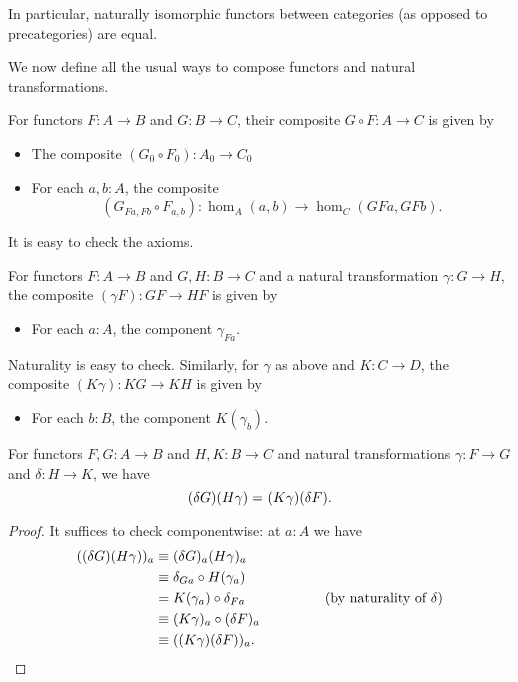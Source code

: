 In particular, naturally isomorphic functors between categories (as opposed to precategories) are equal.

\medskip

We now define all the usual ways to compose functors and natural transformations.

\begin{defn}
  For functors $F:A\to B$ and $G:B\to C$, their composite $G\circ F:A\to C$ is given by
  \begin{itemize}
  \item The composite $(G_0\circ F_0) : A_0 \to C_0$
  \item For each $a,b:A$, the composite
    \[(G_{Fa,Fb}\circ F_{a,b}):\hom_A(a,b) \to \hom_C(GFa,GFb).\]
  \end{itemize}
  It is easy to check the axioms.
\end{defn}

\begin{defn}
  For functors $F:A\to B$ and $G,H:B\to C$ and a natural transformation $\gamma:G\to H$, the composite $(\gamma F):GF\to HF$ is given by
  \begin{itemize}
  \item For each $a:A$, the component $\gamma_{Fa}$.
  \end{itemize}
  Naturality is easy to check.
  Similarly, for $\gamma$ as above and $K:C\to D$, the composite $(K\gamma):KG\to KH$ is given by
  \begin{itemize}
  \item For each $b:B$, the component $K(\gamma_b)$.
  \end{itemize}
\end{defn}

\begin{lem}\label{ct:interchange}
  For functors $F,G:A\to B$ and $H,K:B\to C$ and natural transformations $\gamma:F\to G$ and $\delta:H\to K$, we have
  \[(\delta G)(H\gamma) =_{} (K\gamma)(\delta F).\]
\end{lem}
\begin{proof}
  It suffices to check componentwise: at $a:A$ we have
  \begin{align*}
    ((\delta G)(H\gamma))_a
    &\equiv (\delta G)_{a}(H\gamma)_a\\
    &\equiv \delta_{Ga}\circ H(\gamma_a)\\
    &= K(\gamma_a) \circ \delta_{Fa} \hspace{2cm}\text{(by naturality of $\delta$)}\\
    &\equiv (K \gamma)_a\circ (\delta F)_a\\
    &\equiv ((K \gamma)(\delta F))_a.\qedhere
  \end{align*}
\end{proof}

